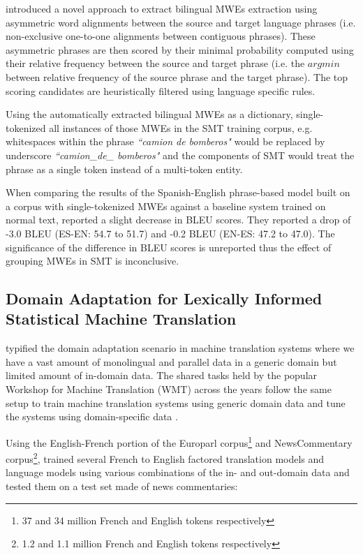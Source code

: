 \cite{lambert2004alignment} introduced a novel approach to extract bilingual MWEs extraction using asymmetric word alignments between the source and target language phrases (i.e. non-exclusive one-to-one alignments between contiguous phrases). These asymmetric phrases are then scored by their minimal probability computed using their relative frequency between the source and target phrase (i.e. the $argmin$ between relative frequency of the source phrase and the target phrase). The top scoring candidates are heuristically filtered using language specific rules.

Using the automatically extracted bilingual MWEs as a dictionary, \cite{lambert2006grouping} single-tokenized all instances of those MWEs in the SMT training corpus, e.g. whitespaces within the phrase \emph{``camion de bomberos"} would be replaced by underscore \emph{``camion\_de\_ bomberos"} and the components of SMT would treat the phrase as a single token instead of a multi-token entity.

When comparing the results of the Spanish-English phrase-based model built on a corpus with single-tokenized MWEs against a baseline system trained on normal text, \cite{lambert2006grouping} reported a slight decrease in BLEU scores. They reported a drop of -3.0 BLEU (ES-EN: 54.7 to 51.7) and -0.2 BLEU  (EN-ES: 47.2 to 47.0). The significance of the difference in BLEU scores is unreported thus the effect of grouping MWEs in SMT is inconclusive. 

\subsection{Domain Adaptation for Lexically Informed Statistical Machine Translation}

\cite{Koehn2007domain} typified the domain adaptation scenario in machine translation systems where we have a vast amount of monolingual and parallel data in a generic domain but limited amount of in-domain data. The shared tasks held by the popular Workshop for Machine Translation (WMT) across the years follow the same setup to train machine translation systems using generic domain data and tune the systems using domain-specific data \citep{callison2010findings,callison2011findings,callisonburch2012findings,bojar2013findings,bojar2014findings,WMT15}.

Using the English-French portion of the Europarl corpus\footnote{37 and 34 million French and English tokens respectively} and NewsCommentary corpus\footnote{1.2 and 1.1 million French and English tokens respectively}, \cite{Koehn2007domain} trained several French to English factored translation models and language models using various combinations of the in- and out-domain data and tested them on a test set made of news commentaries:

